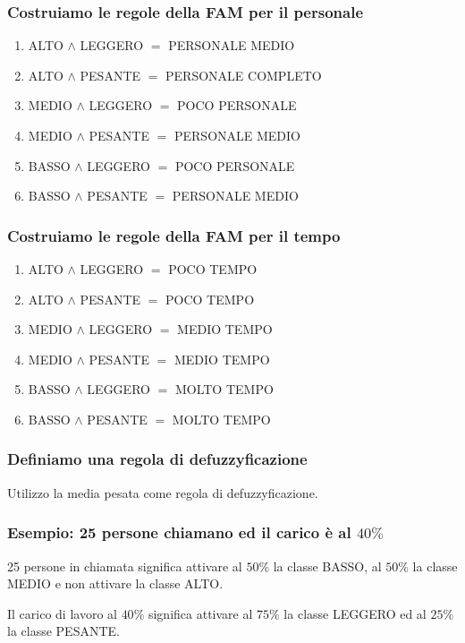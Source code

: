 \documentclass[\main/main.tex]{subfiles}
\begin{document}
\subsubsection*{Costruiamo le regole della FAM per il personale}
\begin{enumerate}
  \item ALTO  $\land$ LEGGERO $=$ PERSONALE MEDIO
  \item ALTO  $\land$ PESANTE $=$ PERSONALE COMPLETO
  \item MEDIO $\land$ LEGGERO $=$ POCO PERSONALE
  \item MEDIO $\land$ PESANTE $=$ PERSONALE MEDIO
  \item BASSO $\land$ LEGGERO $=$ POCO PERSONALE
  \item BASSO $\land$ PESANTE $=$ PERSONALE MEDIO
\end{enumerate}

\subsubsection*{Costruiamo le regole della FAM per il tempo}
\begin{enumerate}
  \item ALTO  $\land$ LEGGERO $=$ POCO TEMPO
  \item ALTO  $\land$ PESANTE $=$ POCO TEMPO
  \item MEDIO $\land$ LEGGERO $=$ MEDIO TEMPO
  \item MEDIO $\land$ PESANTE $=$ MEDIO TEMPO
  \item BASSO $\land$ LEGGERO $=$ MOLTO TEMPO
  \item BASSO $\land$ PESANTE $=$ MOLTO TEMPO
\end{enumerate}

\subsubsection*{Definiamo una regola di defuzzyficazione}
Utilizzo la media pesata come regola di defuzzyficazione.

\subsubsection*{Esempio: 25 persone chiamano ed il carico è al $40\%$}
25 persone in chiamata significa attivare al $50\%$ la classe BASSO, al $50\%$ la classe MEDIO e non attivare la classe ALTO.

Il carico di lavoro al $40\%$ significa attivare al $75\%$ la classe LEGGERO ed al $25\%$ la classe PESANTE.
\end{document}
